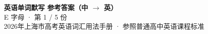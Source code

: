 \documentclass[10pt,a4paper]{article}
\begin{document}
\pagestyle{plain}

\begin{center}
{\LARGE\bfseries 英语单词默写 \quad 参考答案（中 $\to$ 英）}\\[0.22em]
{\large E 字母 · 第 1 / 5 份}\\[0.18em]
{\small 2026年上海市高考英语词汇用法手册 · 参照普通高中英语课程标准}
\end{center}

\vspace{0.2em}
\noindent{\color{rulegray}\rule{\textwidth}{0.8pt}}

\vspace{0.35em}

\vspace{0.25em}
\renewcommand{\arraystretch}{1.32}
\end{document}
